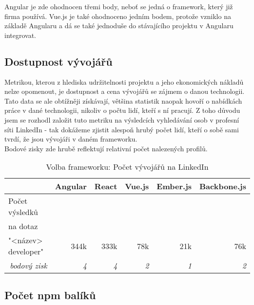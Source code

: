 Angular je zde ohodnocen třemi body, neboť se jedná o framework, který již firma používá. Vue.js je také ohodnoceno jedním bodem, protože vzniklo na základě Angularu a dá se také jednoduše do stávajícího projektu v Angularu integrovat.


\subsection{Dostupnost vývojářů}

Metrikou, kterou z hlediska udržitelnosti projektu a jeho ekonomických nákladů nelze opomenout, je dostupnost a cena vývojářů se zájmem o danou technologii.
\\
Tato data se ale obtížněji získávají, většina statistik naopak hovoří o nabídkách práce v dané technologii, nikoliv o počtu lidí, kteří s ní pracují. Z toho důvodu jsem se rozhodl založit tuto metriku na výsledcích vyhledávání osob v profesní síti LinkedIn - tak dokážeme zjistit alespoň hrubý počet lidí, kteří o sobě sami tvrdí, že jsou vývojáři v daném frameworku.
\\
Bodové zisky zde hrubě reflektují relativní počet nalezených profilů.

\begin{table}[h]
\caption{Volba frameworku: Počet vývojářů na LinkedIn}
\label{table:compare:developers}
\begin{tabular}{lrrrrr}
\hline
                                         & \multicolumn{1}{c}{Angular} & \multicolumn{1}{c}{React} & \multicolumn{1}{c}{Vue.js} & \multicolumn{1}{c}{Ember.js} & \multicolumn{1}{c}{Backbone.js} \\ \hline
Počet výsledků\\na dotaz\\"<název> developer"             & 344k       & 333k                      & 78k                        & 21k                          & 76k                             \\
\multicolumn{1}{r}{\textit{bodový zisk}} & \textit{4}                  & \textit{4}                & \textit{2}                 & \textit{1}                   & \textit{2}                  
\end{tabular}
\end{table}


\subsection{Počet npm balíků}


